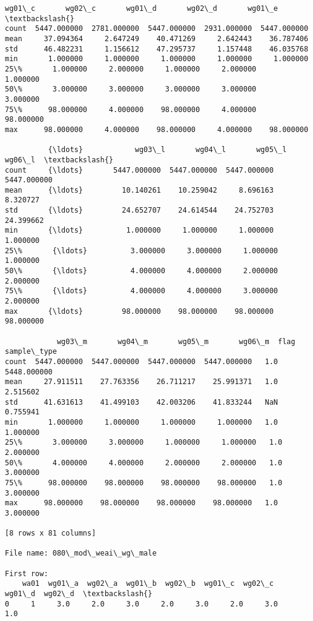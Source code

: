 \documentclass[11pt]{article}
\begin{document}
\begin{Verbatim}[commandchars=\\\{\}]
            wg01\_c       wg02\_c       wg01\_d       wg02\_d       wg01\_e  \textbackslash{}
count  5447.000000  2781.000000  5447.000000  2931.000000  5447.000000   
mean     37.094364     2.647249    40.471269     2.642443    36.787406   
std      46.482231     1.156612    47.295737     1.157448    46.035768   
min       1.000000     1.000000     1.000000     1.000000     1.000000   
25\%       1.000000     2.000000     1.000000     2.000000     1.000000   
50\%       3.000000     3.000000     3.000000     3.000000     3.000000   
75\%      98.000000     4.000000    98.000000     4.000000    98.000000   
max      98.000000     4.000000    98.000000     4.000000    98.000000   

          {\ldots}            wg03\_l       wg04\_l       wg05\_l       wg06\_l  \textbackslash{}
count     {\ldots}       5447.000000  5447.000000  5447.000000  5447.000000   
mean      {\ldots}         10.140261    10.259042     8.696163     8.320727   
std       {\ldots}         24.652707    24.614544    24.752703    24.399662   
min       {\ldots}          1.000000     1.000000     1.000000     1.000000   
25\%       {\ldots}          3.000000     3.000000     1.000000     1.000000   
50\%       {\ldots}          4.000000     4.000000     2.000000     2.000000   
75\%       {\ldots}          4.000000     4.000000     3.000000     2.000000   
max       {\ldots}         98.000000    98.000000    98.000000    98.000000   

            wg03\_m       wg04\_m       wg05\_m       wg06\_m  flag  sample\_type  
count  5447.000000  5447.000000  5447.000000  5447.000000   1.0  5448.000000  
mean     27.911511    27.763356    26.711217    25.991371   1.0     2.515602  
std      41.631613    41.499103    42.003206    41.833244   NaN     0.755941  
min       1.000000     1.000000     1.000000     1.000000   1.0     1.000000  
25\%       3.000000     3.000000     1.000000     1.000000   1.0     2.000000  
50\%       4.000000     4.000000     2.000000     2.000000   1.0     3.000000  
75\%      98.000000    98.000000    98.000000    98.000000   1.0     3.000000  
max      98.000000    98.000000    98.000000    98.000000   1.0     3.000000  

[8 rows x 81 columns]

File name: 080\_mod\_weai\_wg\_male

First row: 
    wa01  wg01\_a  wg02\_a  wg01\_b  wg02\_b  wg01\_c  wg02\_c  wg01\_d  wg02\_d  \textbackslash{}
0     1     3.0     2.0     3.0     2.0     3.0     2.0     3.0     1.0   


\end{Verbatim}
\end{document}
